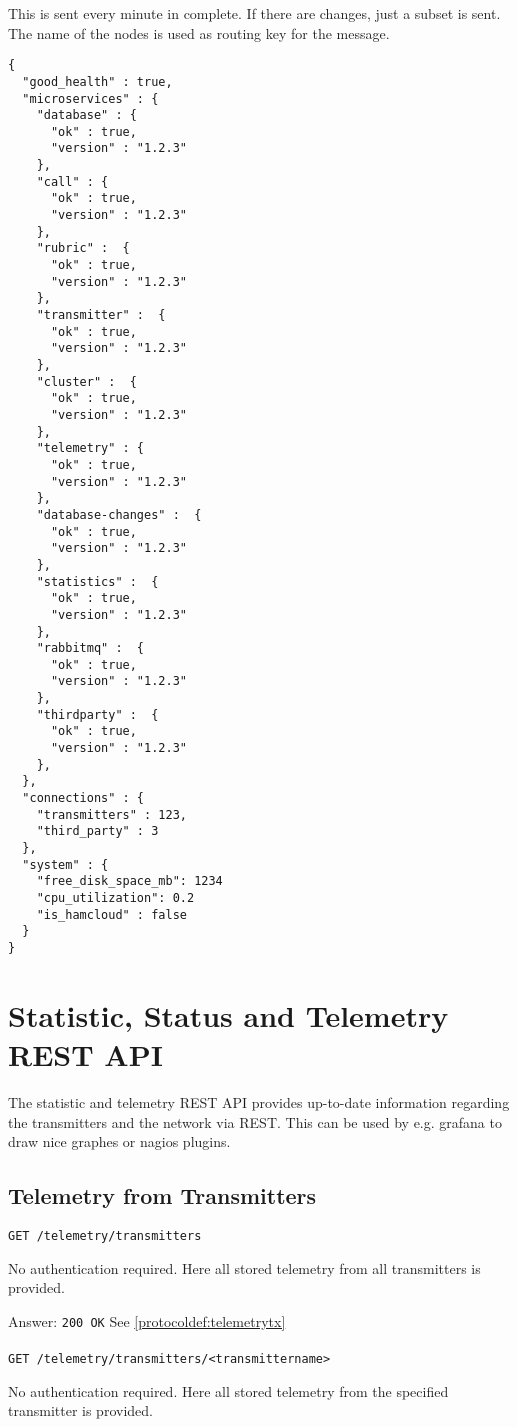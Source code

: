 This is sent every minute in complete. If there are changes, just a subset is sent.
The name of the nodes is used as routing key for the message.
\begin{lstlisting}
{
  "good_health" : true,
  "microservices" : {
    "database" : {
      "ok" : true,
      "version" : "1.2.3"
    },
    "call" : {
      "ok" : true,
      "version" : "1.2.3"
    },
    "rubric" :  {
      "ok" : true,
      "version" : "1.2.3"
    },
    "transmitter" :  {
      "ok" : true,
      "version" : "1.2.3"
    },
    "cluster" :  {
      "ok" : true,
      "version" : "1.2.3"
    },
    "telemetry" : {
      "ok" : true,
      "version" : "1.2.3"
    },
    "database-changes" :  {
      "ok" : true,
      "version" : "1.2.3"
    },
    "statistics" :  {
      "ok" : true,
      "version" : "1.2.3"
    },
    "rabbitmq" :  {
      "ok" : true,
      "version" : "1.2.3"
    },
    "thirdparty" :  {
      "ok" : true,
      "version" : "1.2.3"
    },
  },
  "connections" : {
    "transmitters" : 123,
    "third_party" : 3
  },
  "system" : {
    "free_disk_space_mb": 1234
    "cpu_utilization": 0.2
    "is_hamcloud" : false
  }
}
\end{lstlisting}

\section{Statistic, Status and Telemetry REST API}
The statistic and telemetry REST API provides up-to-date information regarding the transmitters and the network via REST. This can be used by e.g. grafana to draw nice graphes or nagios plugins.





\subsection{Telemetry from Transmitters}

\texttt{GET /telemetry/transmitters}

No authentication required. Here all stored telemetry from all transmitters is provided.

Answer:
\texttt{200 OK}
See \ref{protocoldef:telemetrytx}\\\\

\texttt{GET /telemetry/transmitters/<transmittername>}

No authentication required. Here all stored telemetry from the specified transmitter is provided.

